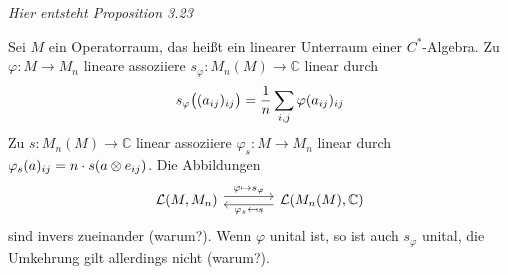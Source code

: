 \begin{proposition}[label=prop:323]
	\emph{Hier entsteht Proposition 3.23}
\end{proposition}

\begin{bemerkung}[label=bem:324]
	Sei $M$ ein Operatorraum, das heißt ein linearer Unterraum einer $C^*$-Algebra.
	Zu $\varphi \colon M \to M_n$ lineare assoziiere $s_\varphi \colon M_n(M) \to \mathbb{C}$ linear durch
	\[
		s_\varphi\enbrace[\big]{(a_{ij})_{ij}} = \frac{1}{n} \sum_{i,j} \varphi(a_{ij})_{ij}
	\]
	Zu $s \colon M_n(M) \to \mathbb{C}$ linear assoziiere $\varphi_s \colon M \to M_n$ linear durch
	\(
		\varphi_s (a)_{ij} = n \cdot s \enbrace*{a \otimes e_{ij}}
	\).
	Die Abbildungen 
	\[
		\begin{tikzcd}[sep=large]
			\mathcal{L}(M,M_n) \rar["\varphi \mapsto s_\varphi",yshift=.7ex] & \mathcal{L} \enbrace*{M_n(M),\mathbb{C}} \lar["\varphi_s \reflectbox{$\mapsto$}s",yshift=-.7ex]
		\end{tikzcd}
	\]
	sind invers zueinander (warum?).
	Wenn $\varphi$ unital ist, so ist auch $s_\varphi$ unital, die Umkehrung gilt allerdings nicht (warum?).
\end{bemerkung}

